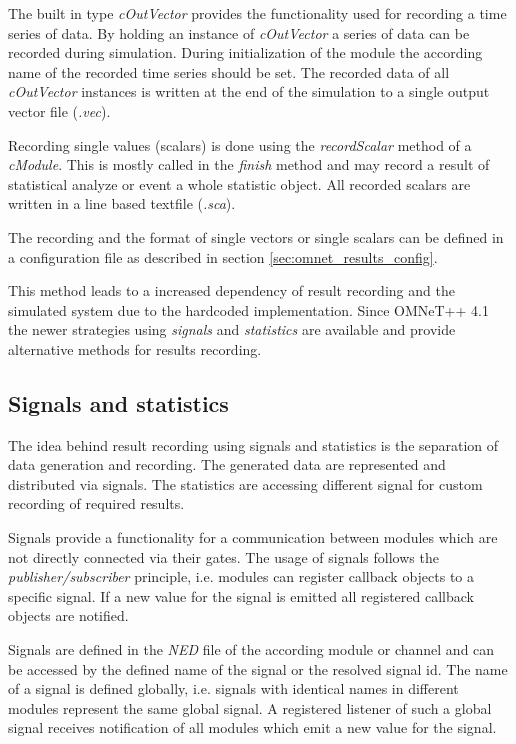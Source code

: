 The built in type \emph{cOutVector} provides the functionality used for recording a time series of data.
By holding an instance of \emph{cOutVector} a series of data can be recorded during simulation.
During initialization of the module the according name of the recorded time series should be set.
The recorded data of all \emph{cOutVector} instances is written at the end of the simulation to a single output vector file (\emph{.vec}). \cite[section 7.9.1]{omnet_manual}

Recording single values (scalars) is done using the \emph{recordScalar} method of a \emph{cModule}.
This is mostly called in the \emph{finish} method and may record a result of statistical analyze or event a whole statistic object.
All recorded scalars are written in a line based textfile (\emph{.sca}). \cite[section 7.9.2]{omnet_manual}

The recording and the format of single vectors or single scalars can be defined in a configuration file as described in section \ref{sec:omnet_results_config}.

This method leads to a increased dependency of result recording and the simulated system due to the hardcoded implementation.
Since OMNeT++ 4.1 the newer strategies using \emph{signals} and \emph{statistics} are available and provide alternative methods for results recording.

\subsection{Signals and statistics}
\label{sec:omnet_results_signals}
The idea behind result recording using signals and statistics is the separation of data generation and recording.
The generated data are represented and distributed via signals.
The statistics are accessing different signal for custom recording of required results. \cite[section 12.1.1]{omnet_manual}

Signals provide a functionality for a communication between modules which are not directly connected via their gates.
The usage of signals follows the \emph{publisher/subscriber} principle, i.e. modules can register callback objects to a specific signal.
If a new value for the signal is emitted all registered callback objects are notified.

Signals are defined in the \emph{NED} file of the according module or channel and can be accessed by the defined name of the signal or the resolved signal id.
The name of a signal is defined globally, i.e. signals with identical names in different modules represent the same global signal.
A registered listener of such a global signal receives notification of all modules which emit a new value for the signal. \cite[section 4.14]{omnet_manual}

